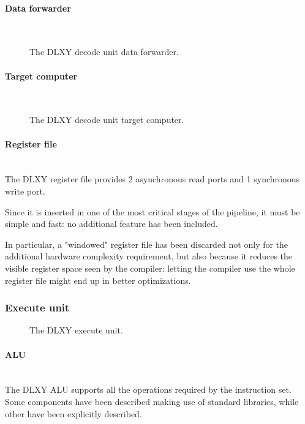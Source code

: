 \paragraph{Data forwarder} \mbox{} \\
\begin{figure}[H]
	\centering
	\caption{The DLXY decode unit data forwarder.}
	\label{fig:id_fwd}
\end{figure}
\paragraph{Target computer} \mbox{} \\
\begin{figure}[H]
	\centering
	\caption{The DLXY decode unit target computer.}
	\label{fig:target_computer}
\end{figure}
\paragraph{Register file} \mbox{} \\
The DLXY register file provides 2 asynchronous read ports and 1 synchronous
write port.

\bigskip
Since it is inserted in one of the most critical stages of the pipeline, it must
be simple and fast: no additional feature has been included.

In particular, a "windowed" register file has been discarded not only for the
additional hardware complexity requirement, but also because it reduces the
visible register space seen by the compiler: letting the compiler use the whole
register file might end up in better optimizations.
\subsubsection{Execute unit}
\begin{figure}[H]
	\centering
	\caption{The DLXY execute unit.}
	\label{fig:execute_unit}
\end{figure}

\paragraph{ALU} \mbox{} \\
The DLXY ALU supports all the operations required by the instruction set.
Some components have been described making use of standard libraries, while
other have been explicitly described.

